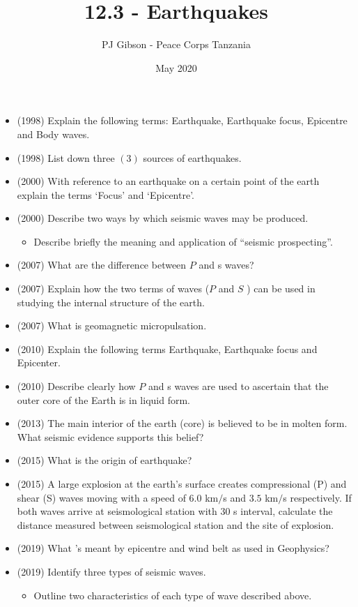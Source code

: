 \documentclass{article}
\title{\textbf{12.3 - Earthquakes}}
\author{PJ Gibson - Peace Corps Tanzania}
\date{May 2020}
\begin{document}
\maketitle

\begin{itemize}
\item (1998)  Explain the following terms: Earthquake, Earthquake focus, Epicentre and Body waves.
\item (1998)  List down three $ (3)$ sources of earthquakes.
\item (2000)  With reference to an earthquake on a certain point of the earth explain the terms ‘Focus’ and ‘Epicentre’.
\item (2000)  Describe two ways by which seismic waves may be produced.
 \begin{itemize}
\item Describe briefly the meaning and application of “seismic prospecting”. 
\end{itemize}
\item (2007)  What are the difference between $ P$ and s waves?
\item (2007)  Explain how the two terms of waves ($ P$ and $ S$ ) can be used in studying the internal structure of the earth. 
\item (2007)  What is geomagnetic micropulsation.
\item (2010)  Explain the following terms Earthquake, Earthquake focus and Epicenter.
\item (2010)  Describe clearly how $ P$ and s waves are used to ascertain that the outer core of the Earth is in liquid form. 
\item (2013)  The main interior of the earth (core) is believed to be in molten form. What seismic evidence supports this belief?
\item (2015)  What is the origin of earthquake?
\item (2015)  A large explosion at the earth's surface creates compressional (P) and shear (S) waves moving with a speed of $ 6.0$ km$/$s and $ 3.5$ km$/$s respectively. If both waves arrive at seismological station with $ 30$ s interval, calculate the distance measured between seismological station and the site of explosion. 
\item (2019)  What 's meant by epicentre and wind belt as used in Geophysics? 
\item (2019)  Identify three types of seismic waves.
 \begin{itemize}
\item Outline two characteristics of each type of wave described above.
\end{itemize}
\end{itemize}
\end{document}
